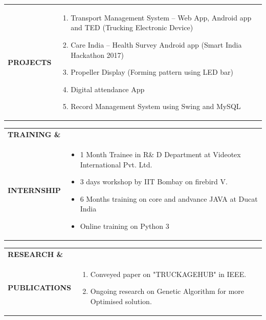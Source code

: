 \documentclass{article}
\begin{document}
\begin{table}[h!]
    \begin{tabular}{l  p{}} 
      \textbf{\Large{PROJECTS}} & 
	\begin{enumerate}
	\item Transport Management System – Web App, Android app and TED (Trucking Electronic Device)
	\item Care India – Health Survey Android app (Smart India Hackathon 2017)
	\item Propeller Display (Forming pattern using LED bar)
	\item Digital attendance App
	\item Record Management System using Swing and MySQL
   	\end{enumerate} 
    \end{tabular}
\end{table}

\begin{table}[h!]
    \begin{tabular}{l  p{}} 
      \textbf{\Large{TRAINING \&}} \\  \textbf{\Large{INTERNSHIP}}& 
	\begin{itemize}
	\item 1 Month Trainee in R\& D Department at Videotex International Pvt. Ltd.
	\item 3 days workshop by IIT Bombay on firebird V.
	\item 6 Months training on core and andvance JAVA at Ducat India
	\item Online training on Python 3
   	\end{itemize} 
    \end{tabular}
\end{table}

\begin{table}[h!]
    \begin{tabular}{l  p{}} 
      \textbf{\Large{RESEARCH \&}} \\  \textbf{\Large{PUBLICATIONS}}& 
	\begin{enumerate}
	\item Conveyed paper on "TRUCKAGEHUB" in IEEE.
	\item Ongoing research on Genetic Algorithm for more Optimised solution.
   	\end{enumerate} 
    \end{tabular}
\end{table}
\end{document}
